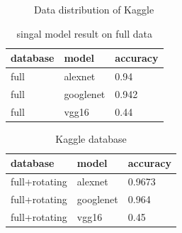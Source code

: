 \documentclass[conference]{IEEEtran}
\begin{document}
\begin{figure}[!ht]
  
\centering
{}
  \hspace{0.05in}
  \hspace{0.05in}
  \caption{Data distribution of Kaggle}
  \label{fig:data}

\end{figure}


\begin{table}[t]
  \caption{singal model result on full data}
  \label{table:table2}
  \centering
  \begin{tabular}{lll}
    \toprule
    \cmidrule{1-3}
    database     &model       &accuracy \\
    \midrule
    full & alexnet     & 0.94 \\
    full & googlenet    &0.942 \\
    full  & vgg16    & 0.44 \\
    \bottomrule
  \end{tabular}
\end{table}


\begin{table}[t]
\small
\centering
\caption{Kaggle database}
\label{table:table3}
\begin{tabular}{lll}
    \toprule
    \cmidrule{1-3}
     database     &model      &accuracy \\
	\midrule
       full+rotating & alexnet     & 0.9673  \\
       full+rotating & googlenet   &0.964    \\
       full+rotating  & vgg16  & 0.45  \\
       \bottomrule
\end{tabular}
\end{table}
\end{document}
